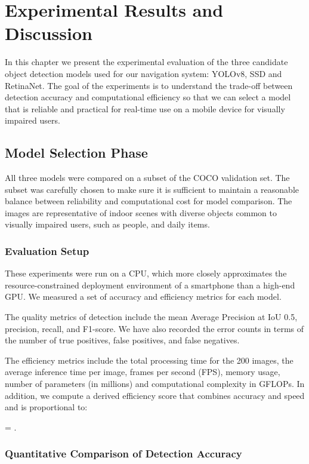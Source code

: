 \documentclass{FastFyp}
\begin{document}
\chapter{Experimental Results and Discussion}

In this chapter we present the experimental evaluation of the three candidate object detection models used for our navigation system: YOLOv8, SSD and RetinaNet. The goal of the experiments is to understand the trade-off between detection accuracy and computational efficiency so that we can select a model that is reliable and practical for real-time use on a mobile device for visually impaired users.

\section{Model Selection Phase}
All three models were compared on a subset of the COCO validation set. The subset was carefully chosen to make sure it is sufficient to maintain a reasonable balance between reliability and computational cost for model comparison. The images are representative of indoor scenes with diverse objects common to visually impaired users, such as people, and daily items.

\subsection{Evaluation Setup}


These experiments were run on a CPU, which more closely approximates the resource-constrained deployment environment of a smartphone than a high-end GPU. We measured a set of accuracy and efficiency metrics for each model.

The quality metrics of detection include the mean Average Precision at IoU 0.5, precision, recall, and F1-score. We have also recorded the error counts in terms of the number of true positives, false positives, and false negatives.

The efficiency metrics include the total processing time for the 200 images, the average inference time per image, frames per second (FPS), memory usage, number of parameters (in millions) and computational complexity in GFLOPs. In addition, we compute a derived efficiency score that combines accuracy and speed and is proportional to:

 = .

\subsection{Quantitative Comparison of Detection Accuracy}
\end{document}
